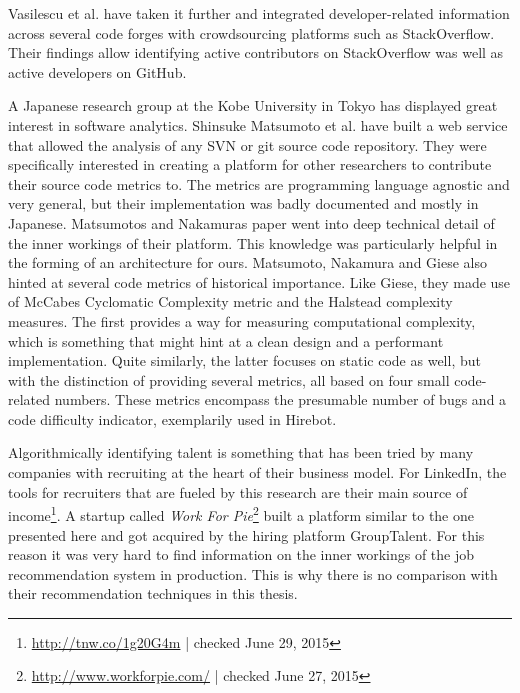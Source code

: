 Vasilescu et al.\cite{vfs:2012} have taken it further and integrated developer-related information across several code forges with crowdsourcing platforms such as StackOverflow.
Their findings allow identifying active contributors on StackOverflow was well as active developers on GitHub.
\newline

A Japanese research group at the Kobe University in Tokyo has displayed great interest in software analytics. Shinsuke Matsumoto et al.\cite{mn:2011} have built a web service that allowed the analysis of any SVN or git source code repository. They were specifically interested in creating a platform for other researchers to contribute their source code metrics to. The metrics are programming language agnostic and very general, but their implementation was badly documented and mostly in Japanese. Matsumotos and Nakamuras paper went into deep technical detail of the inner workings of their platform. This knowledge was particularly helpful in the forming of an architecture for ours. Matsumoto, Nakamura and Giese also hinted at several code metrics of historical importance. Like Giese\cite{pg:2014}, they made use of McCabes Cyclomatic Complexity metric\cite{mc:1976} and the Halstead complexity measures\cite{h:1977}. The first provides a way for measuring computational complexity, which is something that might hint at a clean design and a performant implementation. Quite similarly, the latter focuses on static code as well, but with the distinction of providing several metrics, all based on four small code-related numbers. These metrics encompass the presumable number of bugs and a code difficulty indicator, exemplarily used in Hirebot.
\newline

Algorithmically identifying talent is something that has been tried by many companies with recruiting at the heart of their business model. For LinkedIn, the tools for recruiters that are fueled by this research are their main source of income\footnote{\url{http://tnw.co/1g20G4m} | checked June 29, 2015}. A startup called \textit{Work For Pie}\footnote{\url{http://www.workforpie.com/} | checked June 27, 2015} built a platform similar to the one presented here and got acquired by the hiring platform GroupTalent. For this reason it was very hard to find information on the inner workings of the job recommendation system in production. This is why there is no comparison with their recommendation techniques in this thesis.


